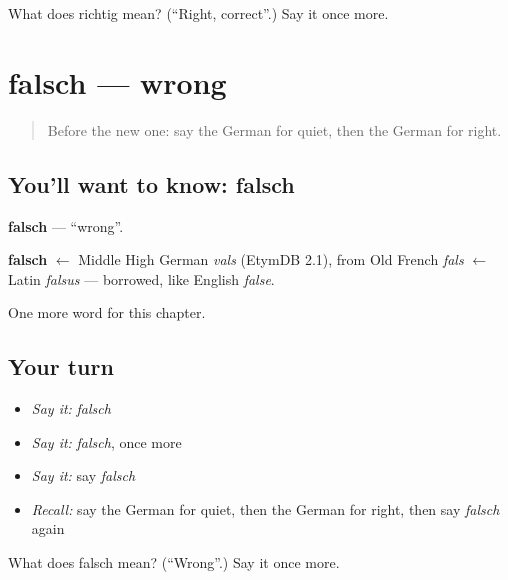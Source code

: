 \begin{tcolorbox}[breakable,colback=teal!4,colframe=teal!35!black,title={Before you move on}]
What does richtig mean? (\textquotedblleft{}Right, correct\textquotedblright{}.) Say it once more.
\end{tcolorbox}
\section[falsch]{falsch — wrong}

\label{lesson:GE-C93-falsch}



\begin{quote}
Before the new one: say the German for quiet, then the German for right.
\end{quote}

\subsection*{You'll want to know: falsch}
\textbf{falsch} — \textquotedblleft{}wrong\textquotedblright{}.

\begin{cousinweb}
\textbf{falsch} $\leftarrow$ Middle High German \emph{vals} (EtymDB 2.1), from Old French \emph{fals} $\leftarrow$ Latin \emph{falsus} — borrowed, like English \emph{false}.
\end{cousinweb}

\begin{grammarlens}[title={What you've built}]
One more word for this chapter.
\end{grammarlens}

\subsection*{Your turn}
\begin{itemize}
\raggedright
  \item \emph{Say it:} \emph{falsch}
  \item \emph{Say it:} \emph{falsch}, once more
  \item \emph{Say it:} say \emph{falsch}
  \item \emph{Recall:} say the German for quiet, then the German for right, then say \emph{falsch} again
\end{itemize}

\begin{tcolorbox}[breakable,colback=teal!4,colframe=teal!35!black,title={Before you move on}]
What does falsch mean? (\textquotedblleft{}Wrong\textquotedblright{}.) Say it once more.
\end{tcolorbox}
